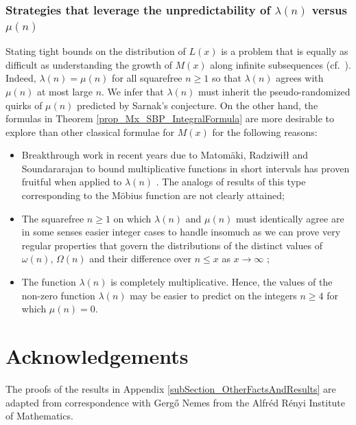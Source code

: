 \documentclass[11pt,reqno,a4letter]{article}
\newcommand{\hlocalref}[1]{\hyperref[#1]{\ref{#1}}}
\numberwithin{equation}{section}
\numberwithin{figure}{section}
\numberwithin{table}{section}
\let\citep\cite
\newcommand{\cf}{cf.~}
\theoremstyle{plain}
\numberwithin{theorem}{section}
\theoremstyle{definition}
\theoremstyle{remark}
\begin{document}
\subsubsection{Strategies that leverage the unpredictability of $\lambda(n)$ versus $\mu(n)$}

Stating tight bounds on the distribution of 
$L(x)$ is a problem that is equally as difficult 
as understanding the growth of $M(x)$
along infinite subsequences (\cf \cite{MR2877066,MR3779960,TAO-LOGAVGD-CHOWLA}). 
Indeed, $\lambda(n) = \mu(n)$ for all squarefree $n \geq 1$ so that 
$\lambda(n)$ agrees with $\mu(n)$ at most large $n$. 
We infer that $\lambda(n)$ must inherit the pseudo-randomized quirks 
of $\mu(n)$ predicted by Sarnak's conjecture. 
On the other hand, the formulas in 
Theorem \hlocalref{prop_Mx_SBP_IntegralFormula} are more desirable to explore than 
other classical formulae for $M(x)$ for the following reasons:
\begin{itemize}
\item Breakthrough work in recent years due to 
	 Matom\"aki, Radziwi{\l\l} and Soundararajan to 
	 bound multiplicative functions 
	 in short intervals has 
	 proven fruitful when applied to $\lambda(n)$ 
	 \cite{SOUND-LLAMBDA-SHORT-INTS,MATRADZE-MULTFUNCS-SHORT-INTS}. 
	 The analogs of results of this type corresponding 
	 to the M\"obius function are not clearly attained; 
\item The squarefree $n \geq 1$ on which $\lambda(n)$ and $\mu(n)$ must identically agree 
	 are in some senses easier integer cases to handle 
	 insomuch as we can prove very regular properties 
	 that govern the distributions of the distinct values of 
	 $\omega(n)$, $\Omega(n)$ and their difference over $n \leq x$ as $x \rightarrow \infty$ 
	 \citep[\cf \S 2.4; \S 7.4]{MV}; 
\item The function $\lambda(n)$ is completely 
	 multiplicative. Hence, the values of the non-zero function $\lambda(n)$ may be 
	 easier to predict on the integers $n \geq 4$ for which $\mu(n) = 0$. 
\end{itemize}

\section*{Acknowledgements}

The proofs of the results in 
Appendix \hlocalref{subSection_OtherFactsAndResults} 
are adapted from correspondence with 
Gerg\H{o} Nemes from the Alfr\'{e}d R\'{e}nyi Institute of Mathematics. 
\end{document}
